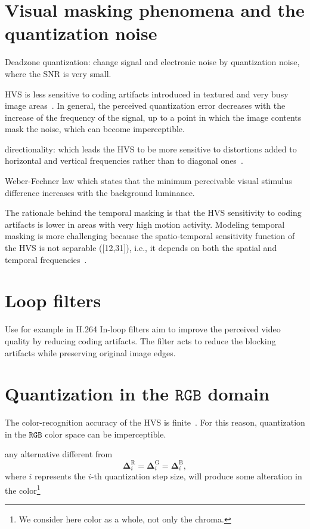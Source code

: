 \section{Visual masking phenomena and the quantization noise}
Deadzone quantization: change signal and electronic noise by
quantization noise, where the SNR is very small.

HVS is less sensitive to coding artifacts introduced in textured and
very busy image areas~\cite{wu2017digital}. In general, the perceived
quantization error decreases with the increase of the frequency of the
signal, up to a point in which the image contents mask the noise,
which can become imperceptible.

directionality: which leads the HVS to be more sensitive to
distortions added to horizontal and vertical frequencies rather than
to diagonal ones~\cite{naccari2014perceptually}.

Weber-Fechner law which states
that the minimum perceivable visual stimulus difference increases with the background luminance.

The rationale behind the temporal masking is that the HVS sensitivity
to coding artifacts is lower in areas with very high motion
activity. Modeling temporal masking is more challenging because the
spatio-temporal sensitivity function of the HVS is not separable
([12,31]), i.e., it depends on both the spatial and temporal
frequencies~\cite{naccari2014perceptually}.

\section{Loop filters}
Use for example in H.264 In-loop filters aim to improve the perceived
video quality by reducing coding artifacts. The filter acts to reduce
the blocking artifacts while preserving original image edges.


\section{Quantization in the $\texttt{RGB}$ domain}

The color-recognition accuracy of the HVS is
finite~\cite{vruiz__visual_redundancy}. For this reason, quantization
in the $\texttt{RGB}$ color space can be imperceptible.

any alternative different from
\begin{equation}
  \mathbf{\Delta}^{\text{R}}_i = \mathbf{\Delta}^{\text{G}}_i =
  \mathbf{\Delta}^{\text{B}}_i,
  \label{eq:simple_Q}
\end{equation}
where $i$ represents the $i$-th quantization step size, will produce
some alteration in the color\footnote{We consider here color as a
whole, not only the chroma.}

